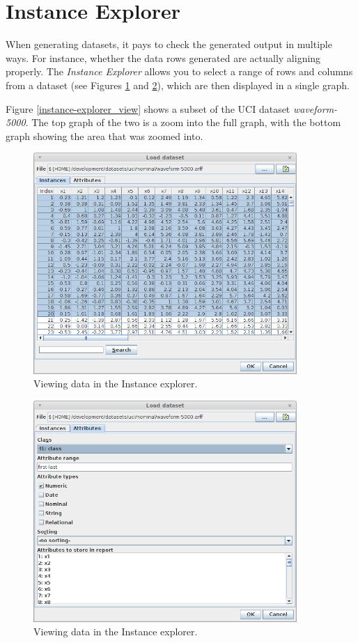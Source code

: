 \clearpage
\section{Instance Explorer}
When generating datasets, it pays to check the generated output in multiple
ways. For instance, whether the data rows generated are actually aligning 
properly. The \textit{Instance Explorer} allows you to select a range of
rows and columns from a dataset (see Figures \ref{instance-explorer_load1}
and \ref{instance-explorer_load2}), which are then displayed in a single
graph.

Figure \ref{instance-explorer_view} shows a subset of the UCI dataset
\textit{waveform-5000}. The top graph of the two is a zoom into the full graph, 
with the bottom graph showing the area that was zoomed into.

\begin{figure}[htb]
  \centering
  \includegraphics[width=10.0cm]{images/instance-explorer_load1.png}
  \caption{Viewing data in the Instance explorer.}
  \label{instance-explorer_load1}
\end{figure}

\begin{figure}[htb]
  \centering
  \includegraphics[width=10.0cm]{images/instance-explorer_load2.png}
  \caption{Viewing data in the Instance explorer.}
  \label{instance-explorer_load2}
\end{figure}

